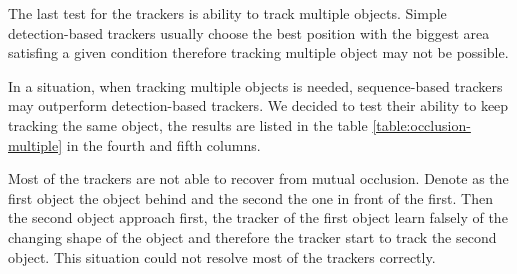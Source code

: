 The last test for the trackers is ability to track multiple objects. Simple
detection-based trackers usually choose the best position with the biggest area
satisfing a given condition therefore tracking multiple object may not be possible.

In a situation, when tracking multiple objects is needed, sequence-based
trackers may outperform detection-based trackers. We decided to test their
ability to keep tracking the same object, the results are listed in the table
\ref{table:occlusion-multiple} in the fourth and fifth columns.


Most of the trackers are not able to recover from mutual occlusion. Denote as
the first object the object behind and the second the one in front of the
first. Then the second object approach first, the tracker of the first object
learn falsely of the changing shape of the object and therefore the tracker start
to track the second object. This situation could not resolve most of the
trackers correctly.

